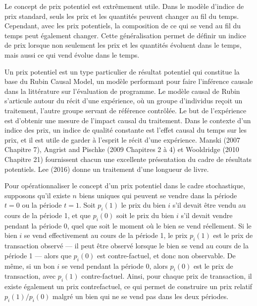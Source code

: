 \documentclass[]{article}
\begin{document}
Le concept de prix potentiel est extrêmement utile. Dans le modèle d'indice de prix standard, seuls les prix et les quantités peuvent changer au fil du temps. Cependant, avec les prix potentiels, la composition de ce qui se vend au fil du temps peut également changer. Cette généralisation permet de définir un indice de prix lorsque non seulement les prix et les quantités évoluent dans le temps, mais aussi ce qui vend évolue dans le temps.

Un prix potentiel est un type particulier de résultat potentiel qui constitue la base du Rubin Causal Model, un modèle performant pour faire l'inférence causale dans la littérature sur l'évaluation de programme. Le modèle causal de Rubin s'articule autour du récit d'une expérience, où un groupe d'individus reçoit un traitement, l'autre groupe servant de référence contrôlée. Le but de l'expérience est d'obtenir une mesure de l'impact causal du traitement. Dans le contexte d'un indice des prix, un indice de qualité constante est l'effet causal du temps sur les prix, et il est utile de garder à l'esprit le récit d'une expérience. Manski (2007 Chapitre 7), Angrist and Pischke (2009 Chapitres 2 à 4) et Wooldridge (2010 Chapitre 21) fournissent chacun une excellente présentation du cadre de résultats potentiels. Lee (2016) donne un traitement d'une longueur de livre.

Pour opérationnaliser le concept d'un prix potentiel dans le cadre stochastique, supposons qu'il existe \(n\) biens uniques qui peuvent se vendre dans la période \(t = 0\) ou la période \(t = 1\). Soit \(p_{i}(1)\) le prix du bien \(i\) s'il devait être vendu au cours de la période 1, et que \(p_{i}(0)\) soit le prix du bien \(i\) s'il devait vendre pendant la période 0, quel que soit le moment où le bien se vend réellement. Si le bien \(i\) se vend effectivement au cours de la période 1, le prix \(p_{i}(1)\) est le prix de transaction observé --- il peut être observé lorsque le bien se vend au cours de la période 1 --- alors que \(p_{i}(0)\) est contre-factuel, et donc non observable. De même, si un bon \(i\) se vend pendant la période 0, alors \(p_{i}(0)\) est le prix de transaction, avec \(p_{i}(1)\) contre-factuel. Ainsi, pour chaque prix de transaction, il existe également un prix contrefactuel, ce qui permet de construire un prix relatif \(p_{i}(1)/ p_{i}(0)\) malgré un bien qui ne se vend pas dans les deux périodes.
\end{document}
